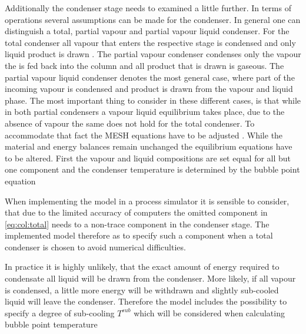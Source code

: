         Additionally the condenser stage needs to examined a little further. In terms of operations
        several assumptions can be made for the condenser. In general one can distinguish a total,
        partial vapour and partial vapour liquid condenser. For the total condenser all vapour that
        enters the respective stage is condensed and only liquid product is drawn . The partial vapour
        condenser condenses only the vapour the is fed back into
        the column and all product that is drawn is gaseous. The partial vapour liquid condenser
        denotes the most general case, where part of the incoming vapour is condensed and product
        is drawn from the vapour and liquid phase. The most important thing to consider in these different cases,
        is that while in both partial condensers a vapour liquid equilibrium takes place, due to the
        absence of vapour the same does not hold for the total condenser. To accommodate that fact
        the MESH equations have to be adjusted \cite{Naphtali.1971}. While the material and energy
        balances remain unchanged the equilibrium equations have to be altered. First the vapour and
        liquid compositions are set equal for all but one component
        and the condenser temperature is determined by the bubble point equation

        When implementing the model in a process simulator it is sensible to consider, that due to
        the limited accuracy of computers the omitted component in \eqref{eq:col:total} needs to
        a non-trace component in the condenser stage. The implemented model therefore as to specify
        such a component when a total condenser is chosen to avoid numerical difficulties.

        In practice it is highly unlikely, that the exact amount of energy required to condensate all
        liquid will be drawn from the condenser. More likely, if all vapour is condensed, a little more
        energy will be withdrawn and slightly sub-cooled liquid will leave the condenser. Therefore
        the model includes the possibility to specify a degree of sub-cooling $T^{sub}$ which will be
        considered when calculating bubble point temperature



